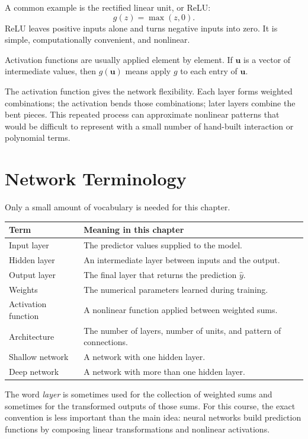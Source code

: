 A common example is the rectified linear unit, or ReLU:
\begin{equation}
  g(z)=\max(z,0).
\end{equation}
ReLU leaves positive inputs alone and turns negative inputs into zero.  It is simple, computationally convenient, and nonlinear.

Activation functions are usually applied element by element.  If \(\mathbf{u}\) is a vector of intermediate values, then \(g(\mathbf{u})\) means apply \(g\) to each entry of \(\mathbf{u}\).

The activation function gives the network flexibility.  Each layer forms weighted combinations; the activation bends those combinations; later layers combine the bent pieces.  This repeated process can approximate nonlinear patterns that would be difficult to represent with a small number of hand-built interaction or polynomial terms.

\section{Network Terminology}

Only a small amount of vocabulary is needed for this chapter.

\begin{center}
\begin{tabular}{p{}p{}}
\toprule
\textbf{Term} & \textbf{Meaning in this chapter} \\
\midrule
Input layer & The predictor values supplied to the model. \\
Hidden layer & An intermediate layer between inputs and the output. \\
Output layer & The final layer that returns the prediction \(\widehat{y}\). \\
Weights & The numerical parameters learned during training. \\
Activation function & A nonlinear function applied between weighted sums. \\
Architecture & The number of layers, number of units, and pattern of connections. \\
Shallow network & A network with one hidden layer. \\
Deep network & A network with more than one hidden layer. \\
\bottomrule
\end{tabular}
\end{center}

The word \emph{layer} is sometimes used for the collection of weighted sums and sometimes for the transformed outputs of those sums.  For this course, the exact convention is less important than the main idea: neural networks build prediction functions by composing linear transformations and nonlinear activations.

